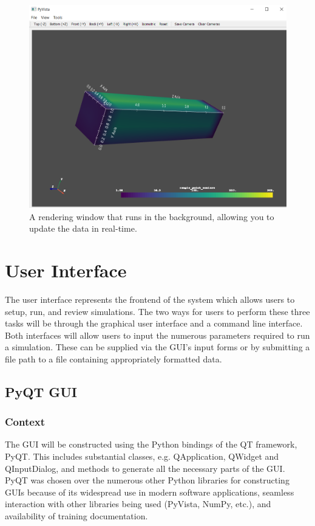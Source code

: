\documentclass[onecolumn, draftclsnofoot,10pt, compsoc]{IEEEtran}
\begin{document}
\begin{figure}[H]
\centering
\includegraphics[scale=0.5]{backgroundplotter.png}
\caption{A rendering window that runs in the background, allowing you to update the data in real-time.}
\label{fig:backgroundplotter}
\end{figure}

\section{User Interface}
The user interface represents the frontend of the system which allows users to setup, run, and review simulations. The two ways for users to perform these three tasks will be through the graphical user interface and a command line interface. Both interfaces will allow users to input the numerous parameters required to run a simulation. These can be supplied via the GUI’s input forms or by submitting a file path to a file containing appropriately formatted data.
\subsection{PyQT GUI}
\subsubsection{Context}
The GUI will be constructed using the Python bindings of the QT framework, PyQT. This includes substantial classes, e.g. QApplication, QWidget and QInputDialog, and methods to generate all the necessary parts of the GUI. PyQT was chosen over the numerous other Python libraries for constructing GUIs because of its widespread use in modern software applications, seamless interaction with other libraries being used (PyVista, NumPy, etc.), and availability of training documentation.
\end{document}
